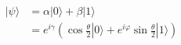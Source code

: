 \documentclass[preview]{standalone}
\begin{document}
\begin{align*}
|\psi\rangle &= \alpha |0\rangle + \beta |1\rangle \\ &=e^{i\gamma} \left(\cos{\frac{\theta}{2}} |0\rangle + e^{i\varphi}\sin{\frac{\theta}{2}}|1\rangle\right)
\end{align*}
\end{document}
